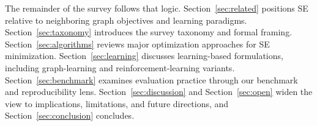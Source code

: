 The remainder of the survey follows that logic.
Section~\ref{sec:related} positions SE relative to neighboring graph
objectives and learning paradigms.
Section~\ref{sec:taxonomy} introduces the survey taxonomy and formal framing.
Section~\ref{sec:algorithms} reviews major optimization approaches for SE
minimization.
Section~\ref{sec:learning} discusses learning-based formulations, including
graph-learning and reinforcement-learning variants.
Section~\ref{sec:benchmark} examines evaluation practice through our benchmark
and reproducibility lens.
Section~\ref{sec:discussion} and Section~\ref{sec:open} widen the view to
implications, limitations, and future directions, and
Section~\ref{sec:conclusion} concludes.

